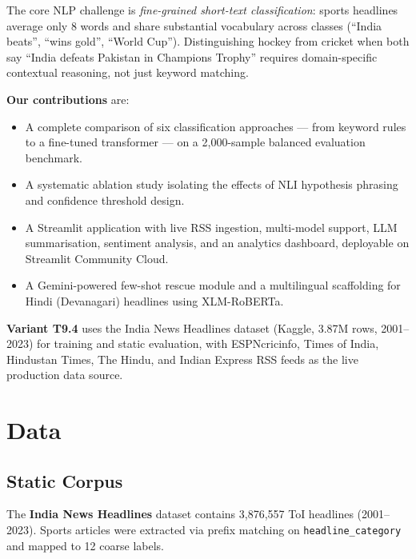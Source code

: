 \documentclass[11pt,a4paper]{article}
\begin{document}
The core NLP challenge is \textit{fine-grained short-text classification}: sports headlines average only 8 words and share substantial vocabulary across classes (``India beats'', ``wins gold'', ``World Cup''). Distinguishing hockey from cricket when both say ``India defeats Pakistan in Champions Trophy'' requires domain-specific contextual reasoning, not just keyword matching.

\textbf{Our contributions} are:
\begin{itemize}[noitemsep]
  \item A complete comparison of six classification approaches — from keyword rules to a fine-tuned transformer — on a 2,000-sample balanced evaluation benchmark.
  \item A systematic ablation study isolating the effects of NLI hypothesis phrasing and confidence threshold design.
  \item A Streamlit application with live RSS ingestion, multi-model support, LLM summarisation, sentiment analysis, and an analytics dashboard, deployable on Streamlit Community Cloud.
  \item A Gemini-powered few-shot rescue module and a multilingual scaffolding for Hindi (Devanagari) headlines using XLM-RoBERTa.
\end{itemize}

\textbf{Variant T9.4} uses the India News Headlines dataset (Kaggle, 3.87M rows, 2001--2023) for training and static evaluation, with ESPNcricinfo, Times of India, Hindustan Times, The Hindu, and Indian Express RSS feeds as the live production data source.

\section{Data}

\subsection{Static Corpus}

The \textbf{India News Headlines} dataset \cite{therohk2022} contains 3,876,557 ToI headlines (2001--2023). Sports articles were extracted via prefix matching on \texttt{headline\_category} and mapped to 12 coarse labels.
\end{document}
